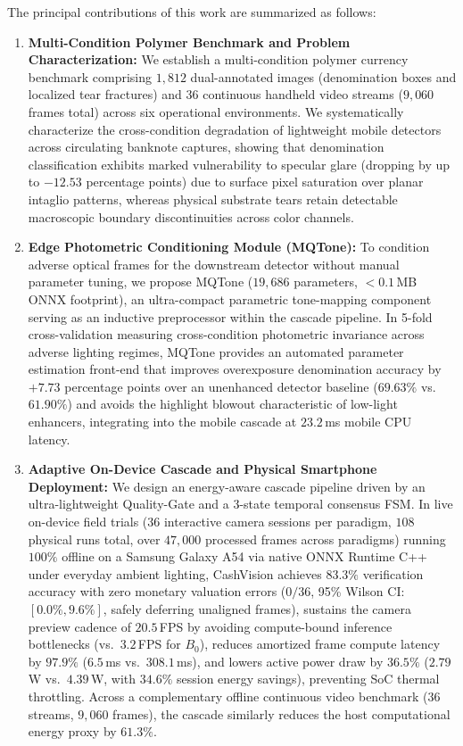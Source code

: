 \documentclass[final,5p,times,twocolumn,authoryear]{elsarticle}
\begin{document}
The principal contributions of this work are summarized as follows:
\begin{enumerate}[label=\textbf{(C\arabic*)}]
    \item \textbf{Multi-Condition Polymer Benchmark and Problem Characterization:} We establish a multi-condition polymer currency benchmark comprising $1{,}812$ dual-annotated images (denomination boxes and localized tear fractures) and $36$ continuous handheld video streams ($9{,}060$ frames total) across six operational environments. We systematically characterize the cross-condition degradation of lightweight mobile detectors across circulating banknote captures, showing that denomination classification exhibits marked vulnerability to specular glare (dropping by up to $-12.53$ percentage points) due to surface pixel saturation over planar intaglio patterns, whereas physical substrate tears retain detectable macroscopic boundary discontinuities across color channels.
    \item \textbf{Edge Photometric Conditioning Module (MQTone):} To condition adverse optical frames for the downstream detector without manual parameter tuning, we propose MQTone ($19{,}686$ parameters, $<0.1$\,MB ONNX footprint), an ultra-compact parametric tone-mapping component serving as an inductive preprocessor within the cascade pipeline. In 5-fold cross-validation measuring cross-condition photometric invariance across adverse lighting regimes, MQTone provides an automated parameter estimation front-end that improves overexposure denomination accuracy by $+7.73$ percentage points over an unenhanced detector baseline ($69.63\%$ vs.\ $61.90\%$) and avoids the highlight blowout characteristic of low-light enhancers, integrating into the mobile cascade at $23.2$\,ms mobile CPU latency.
    \item \textbf{Adaptive On-Device Cascade and Physical Smartphone Deployment:} We design an energy-aware cascade pipeline driven by an ultra-lightweight Quality-Gate and a 3-state temporal consensus FSM. In live on-device field trials ($36$ interactive camera sessions per paradigm, $108$ physical runs total, over $47{,}000$ processed frames across paradigms) running $100\%$ offline on a Samsung Galaxy A54 via native ONNX Runtime C++ under everyday ambient lighting, CashVision achieves $83.3\%$ verification accuracy with zero monetary valuation errors ($0/36$, 95\% Wilson CI: $[0.0\%, 9.6\%]$, safely deferring unaligned frames), sustains the camera preview cadence of $20.5$\,FPS by avoiding compute-bound inference bottlenecks (vs.\ $3.2$\,FPS for $B_0$), reduces amortized frame compute latency by $97.9\%$ ($6.5$\,ms vs.\ $308.1$\,ms), and lowers active power draw by $36.5\%$ ($2.79$\,W vs.\ $4.39$\,W, with $34.6\%$ session energy savings), preventing SoC thermal throttling. Across a complementary offline continuous video benchmark ($36$ streams, $9{,}060$ frames), the cascade similarly reduces the host computational energy proxy by $61.3\%$.

\end{enumerate}
\end{document}

